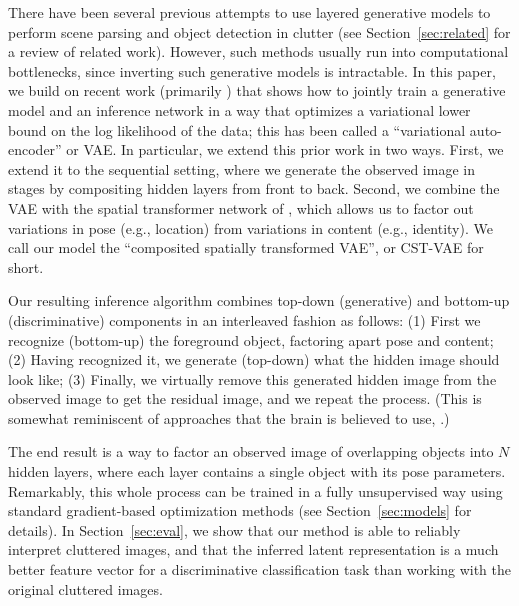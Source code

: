 There have been several previous attempts to use layered generative
models to perform scene parsing and object detection in clutter (see
Section~\ref{sec:related} for a review of related work). However, such
methods usually run into computational bottlenecks, since inverting
such generative models is intractable.
In this paper, we build on recent work (primarily \cite{Kingma2014,gregor2015draw})
that shows how to jointly train a generative model and an inference
network in a way that optimizes a variational lower bound on the log
likelihood of the data;
this has been called a ``variational auto-encoder'' or VAE.
In particular, we extend this prior work in
two ways. First, we extend it to the sequential setting, where we
generate the observed image in stages by compositing hidden layers
from front to back. %
Second, we combine the VAE with the spatial transformer network of
\citep{jaderberg2015spatial}, which allows us to factor out variations
in pose (e.g., location) from variations in content (e.g., identity).
We call our model the ``composited spatially transformed VAE'', or CST-VAE
for short.

Our resulting inference algorithm combines top-down (generative)
and bottom-up (discriminative) components in an interleaved fashion as follows:
(1)  First we recognize (bottom-up) the foreground object, factoring apart pose and content;
(2) Having recognized it, we generate (top-down) what the hidden image  should look
like;
(3) Finally, we virtually remove this generated hidden image from the observed
image to get the residual image, and we repeat the process.
(This is somewhat reminiscent of approaches that the brain is believed
to use, \cite{Hochstein2002}.)

The end result is a way to factor an observed image of
overlapping objects into $N$
hidden layers, where each layer contains a single object
with its pose parameters.
Remarkably, this whole process can be trained in a fully unsupervised
way using standard gradient-based optimization methods
(see Section~\ref{sec:models} for details).
In Section~\ref{sec:eval}, we show that our method is able to reliably
interpret cluttered images, and that the inferred latent
representation is a much better  feature vector for a discriminative
classification task than working with the original cluttered images.

\vspace{-3mm}


